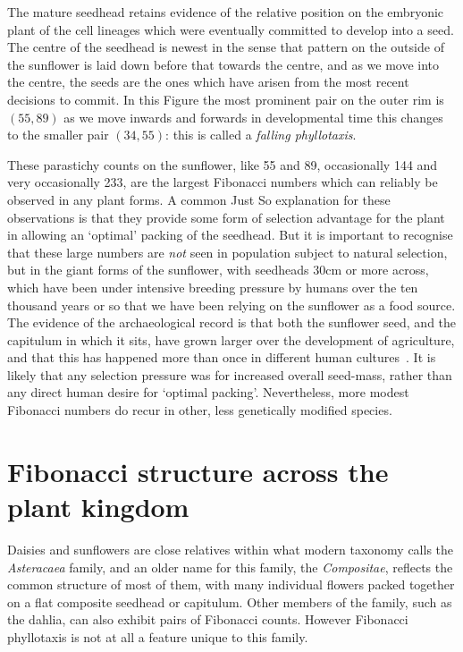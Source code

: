 The mature seedhead retains evidence of the relative position on the embryonic plant of the cell lineages which were eventually committed to develop into a seed. The centre of the seedhead is newest in the sense that pattern on the outside of the sunflower is laid down before that towards the centre, and as we move into the centre, the seeds are the ones which have arisen from the most recent decisions to commit. In this Figure the most prominent pair on the outer rim is $({55,89})$  as we move inwards and forwards in developmental time this changes to the smaller pair $({34,55})$: this is called a \textit{falling phyllotaxis}. 

These parastichy counts on the sunflower, like 55 and 89,  occasionally 144 and very occasionally 233, are the largest Fibonacci numbers which can reliably be observed in any plant forms. A common Just So explanation for these observations is that they provide some form of selection advantage for the plant in allowing an `optimal' packing of the seedhead. But it is important to recognise that these large numbers are \textit{not} seen in population subject to natural selection, but in the giant forms of the sunflower, with seedheads 30cm or more across, which have been under intensive breeding pressure by humans over the ten thousand years or so that we have been relying on the sunflower as a food source. 
The evidence of the archaeological record is that both
 the sunflower seed, and the capitulum in which it sits, have grown larger over the development of agriculture, and that this has happened more than once in different human cultures~\autocite{lentzSunflowerHelianthusAnnuus2008,burkeGeneticAnalysisSunflower2002}. It is likely that any selection pressure was for increased overall seed-mass, rather than any direct human desire for `optimal packing'. Nevertheless, more modest Fibonacci numbers do recur in other, less genetically modified species. 

\section{Fibonacci structure across the plant kingdom}
 Daisies and sunflowers are close relatives within what modern taxonomy calls the \textit{Asteracaea} family,  and an older name for this family, the \textit{Compositae}, reflects the common structure of most of them, with many individual flowers packed together on a flat composite seedhead or capitulum. Other members of the family, such as the dahlia, can also exhibit pairs of Fibonacci counts.
However Fibonacci phyllotaxis is not at all a feature unique to this family.

